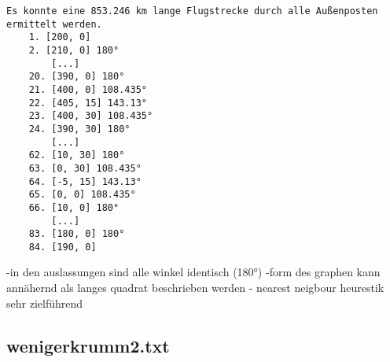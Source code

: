 \documentclass[a4paper,10pt,ngerman]{scrartcl}
\begin{document}
    \begin{lstlisting}[frame=single, title=Programmausgabe wenigerkrumm1.txt, breaklines=true,label={lst:lstlisting4}]
    Es konnte eine 853.246 km lange Flugstrecke durch alle Außenposten ermittelt werden.
    1. [200, 0]
    2. [210, 0] 180°
        [...]
    20. [390, 0] 180°
    21. [400, 0] 108.435°
    22. [405, 15] 143.13°
    23. [400, 30] 108.435°
    24. [390, 30] 180°
        [...]
    62. [10, 30] 180°
    63. [0, 30] 108.435°
    64. [-5, 15] 143.13°
    65. [0, 0] 108.435°
    66. [10, 0] 180°
        [...]
    83. [180, 0] 180°
    84. [190, 0]
    \end{lstlisting}

    -in den auslassungen sind alle winkel identisch (180°)
    -form des graphen kann annähernd als langes quadrat beschrieben werden
    - nearest neigbour heurestik sehr zielführend

    \subsection{wenigerkrumm2.txt}\label{subsec:wenigerkrumm2.txt}
\end{document}
